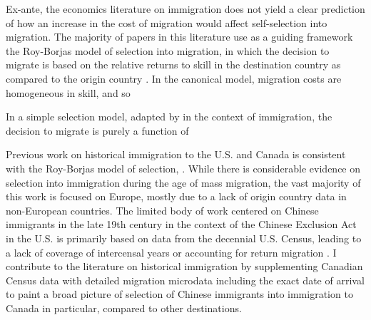 Ex-ante, the economics literature on immigration does not yield a clear prediction of how an increase in the cost of migration would affect self-selection into migration. The majority of papers in this literature use as a guiding framework the Roy-Borjas model of selection into migration, in which the decision to migrate is based on the relative returns to skill in the destination country as compared to the origin country \citep{roy1951,borjas1987}. In the canonical model, migration costs are homogeneous in skill, and so  

In a simple \citet{roy1951} selection model, adapted by \citet{borjas1987} in the context of immigration, the decision to migrate is purely a function of 





Previous work on historical immigration to the U.S. and Canada is consistent with the Roy-Borjas model of selection, \citep{roy1951,borjas1987, Abramitzkyetal2013, abramitzkyboustan2017, connor2019}. While there is considerable evidence on selection into immigration during the age of mass migration, the vast majority of this work is focused on Europe, mostly due to a lack of origin country data in non-European countries. The limited body of work centered on Chinese immigrants in the late 19th century in the context of the Chinese Exclusion Act in the U.S. is primarily based on data from the decennial U.S. Census, leading to a lack of coverage of intercensal years or accounting for return migration \citep{Chen2015,ChenXie2020}. 
I contribute to the literature on historical immigration by supplementing Canadian Census data with detailed migration microdata including the exact date of arrival to paint a broad picture of selection of Chinese immigrants into immigration to Canada in particular, compared to other destinations.

